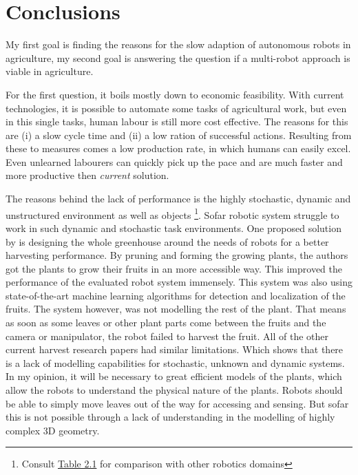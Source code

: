 

    \chapter{Conclusions}

    My first goal is finding the reasons for the slow adaption of autonomous robots in agriculture, my second goal is answering the question if a multi-robot approach is viable in agriculture.
    
    For the first question, it boils mostly down to economic feasibility. With current technologies, it is possible to automate some tasks of agricultural work, but even in this single tasks, human labour is still more cost effective. The reasons for this are (i) a slow cycle time and (ii)  a low ration of successful actions. Resulting from these to measures comes a low production rate, in which humans can easily excel. Even unlearned labourers can quickly pick up the pace and are much faster and more productive then \emph{current} solution. \cite{Bechar2017}

    The reasons behind the lack of performance is the highly stochastic, dynamic and unstructured environment as well as objects \footnote{Consult \hyperref[table:objects_and_tasks]{Table 2.1} for comparison with other robotics domains}. Sofar robotic system struggle to work in such dynamic and stochastic task environments. 
    One proposed solution by \cite{Herck2020} is designing the whole greenhouse around the needs of robots for a better harvesting performance. By pruning and forming the growing plants, the authors got the plants to grow their fruits in an more accessible way. This improved the performance of the evaluated robot system immensely. This system was also using state-of-the-art machine learning algorithms for detection and localization of the fruits. The system however, was not modelling the rest of the plant. That means as soon as some leaves or other plant parts come between the fruits and the camera or manipulator, the robot failed to harvest the fruit. 
    All of the other current harvest research papers had similar limitations. Which shows that there is a lack of modelling capabilities for stochastic, unknown and dynamic systems. In my opinion, it will be necessary to great efficient models of the plants, which allow the robots to understand the physical nature of the plants. Robots should be able to simply move leaves out of the way for accessing and sensing. But sofar this is not possible through a lack of understanding in the modelling of highly complex 3D geometry.

